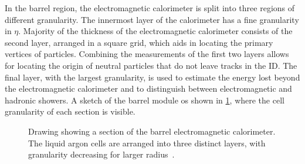 In the barrel region, the electromagnetic calorimeter is split into three regions of different granularity. The innermost layer of the calorimeter has a fine granularity in $\eta$. Majority of the thickness of the electromagnetic calorimeter consists of the second layer, arranged in a square grid, which aids in locating the primary vertices of particles. Combining the measurements of the first two layers allows for locating the origin of neutral particles that do not leave tracks in the ID. The final layer, with the largest granularity, is used to estimate the energy lost beyond the electromagnetic calorimeter and to distinguish between electromagnetic and hadronic showers. A sketch of the barrel module os shown in \cref{fig:method:ATLAS:ECal}, where the cell granularity of each section is visible.
\begin{figure}
    \centering
    \caption[Drawing showing a section of the barrel electromagnetic calorimeter]{Drawing showing a section of the barrel electromagnetic calorimeter.
    The liquid argon cells are arranged into three distinct layers, with granularity decreasing for larger radius~\cite{ATLAS}.}
    \label{fig:method:ATLAS:ECal}
\end{figure}

